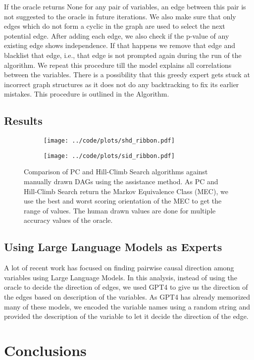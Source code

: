 \documentclass[letterpaper]{article} %
\begin{document}
If the oracle returns None for any pair of variables, an edge between this pair
is not suggested to the oracle in future iterations. We also make sure that
only edges which do not form a cyclic in the graph are used to select the next
potential edge. After adding each edge, we also check if the p-value of any
existing edge shows independence. If that happens we remove that edge and
blacklist that edge, i.e., that edge is not prompted again during the run of
the algorithm. We repeat this procedure till the model explains all
correlations between the variables. There is a possibility that this greedy
expert gets stuck at incorrect graph structures as it does not do any
backtracking to fix its earlier mistakes. This procedure is outlined in the
Algorithm.

\subsection{Results}
\begin{figure}
	\begin{subfigure}{0.5\textwidth}
		\centering
		\texttt{[image: ../code/plots/shd\_ribbon.pdf]}
		\caption{}
	\end{subfigure}
	\begin{subfigure}{0.5\textwidth}
		\centering
		\texttt{[image: ../code/plots/sid\_ribbon.pdf]}
		\caption{}
	\end{subfigure}
	\caption{Comparison of PC and Hill-Climb Search algorithms against
		manually drawn DAGs using the assistance method. As PC and
		Hill-Climb Search return the Markov Equivalence Class (MEC), we
		use the best and worst scoring orientation of the MEC to get
		the range of values. The human drawn values are done for
		multiple accuracy values of the oracle.}
\end{figure}

\subsection{Using Large Language Models as Experts}
A lot of recent work has focused on finding pairwise causal direction among
variables using Large Language Models. In this analysis, instead of using the
oracle to decide the direction of edges, we used GPT4 to give us the direction
of the edges based on description of the variables. As GPT4 has already
memorized many of these models, we encoded the variable names using a random
string and provided the description of the variable to let it decide the
direction of the edge.

\section{Conclusions}


\end{document}
